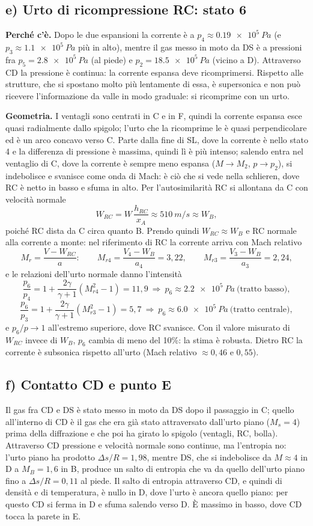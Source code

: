 \documentclass[11pt,a4paper]{article}
\begin{document}
\subsection*{e) Urto di ricompressione RC: stato 6}
\textbf{Perché c'è.} Dopo le due espansioni la corrente è a $p_4\approx\SI{0.19e5}{Pa}$ (e $p_3\approx\SI{1.1e5}{Pa}$
più in alto), mentre il gas messo in moto da DS è a pressioni fra $p_5=\SI{2.8e5}{Pa}$ (al piede) e
$p_2=\SI{18.5e5}{Pa}$ (vicino a D). Attraverso CD la pressione è continua: la corrente espansa deve ricomprimersi.
Rispetto alle strutture, che si spostano molto più lentamente di essa, è supersonica e non può ricevere l'informazione
da valle in modo graduale: si ricomprime con un urto.

\textbf{Geometria.} I ventagli sono centrati in C e in F, quindi la corrente espansa esce quasi radialmente dallo
spigolo; l'urto che la ricomprime le è quasi perpendicolare ed è un arco concavo verso C. Parte dalla fine di SL,
dove la corrente è nello stato 4 e la differenza di pressione è massima, quindi lì è più intenso; salendo entra nel
ventaglio di C, dove la corrente è sempre meno espansa ($M\to M_2$, $p\to p_2$), si indebolisce e svanisce come onda
di Mach: è ciò che si vede nella schlieren, dove RC è netto in basso e sfuma in alto. Per l'autosimilarità RC si
allontana da C con velocità normale
\[
  W_{RC}=W\,\frac{h_{RC}}{x_A}\approx\SI{510}{m/s}\approx W_B ,
\]
poiché RC dista da C circa quanto B. Prendo quindi $W_{RC}\approx W_B$ e RC normale alla corrente a monte: nel
riferimento di RC la corrente arriva con Mach relativo
\[
  M_{r}=\frac{V-W_{RC}}{a}:\qquad
  M_{r4}=\frac{V_4-W_B}{a_4}=3{,}22,\qquad M_{r3}=\frac{V_3-W_B}{a_3}=2{,}24 ,
\]
e le relazioni dell'urto normale danno l'intensità
\[
  \frac{p_6}{p_4}=1+\frac{2\gamma}{\gamma+1}(M_{r4}^2-1)=11{,}9\ \Rightarrow\ p_6\approx\SI{2.2e5}{Pa}\ \text{(tratto basso)},
\]
\[
  \frac{p_6}{p_3}=1+\frac{2\gamma}{\gamma+1}(M_{r3}^2-1)=5{,}7\ \Rightarrow\ p_6\approx\SI{6.0e5}{Pa}\ \text{(tratto centrale)},
\]
e $p_6/p\to1$ all'estremo superiore, dove RC svanisce. Con il valore misurato di $W_{RC}$ invece di $W_B$, $p_6$
cambia di meno del 10\%: la stima è robusta. Dietro RC la corrente è subsonica rispetto all'urto (Mach relativo
$\approx0{,}46$ e $0{,}55$).

\subsection*{f) Contatto CD e punto E}
Il gas fra CD e DS è stato messo in moto da DS dopo il passaggio in C; quello all'interno di CD è il gas che era già
stato attraversato dall'urto piano ($M_s=4$) prima della diffrazione e che poi ha girato lo spigolo (ventagli, RC,
bolla). Attraverso CD pressione e velocità normale sono continue, ma l'entropia no: l'urto piano ha prodotto
$\Delta s/R=1{,}98$, mentre DS, che si indebolisce da $M\approx4$ in D a $M_B=1{,}6$ in B, produce un salto di entropia
che va da quello dell'urto piano fino a $\Delta s/R=0{,}11$ al piede. Il salto di entropia attraverso CD, e quindi di
densità e di temperatura, è nullo in D, dove l'urto è ancora quello piano: per questo CD si ferma in D e sfuma salendo
verso D. È massimo in basso, dove CD tocca la parete in E.
\end{document}
